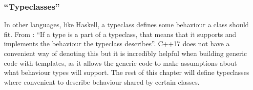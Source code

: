


\subsubsection{``Typeclasses''}
In other languages, like Haskell, a typeclass defines some behaviour a class should fit. From \cite{learnyouahaskell}: ``If a type is a part of a typeclass, that means that it supports and implements the behaviour the typeclass describes''.
C++17 does not have a convenient way of denoting this but it is incredibly helpful when building generic code with templates, as it allows the generic code to make assumptions about what behaviour types will support.
The rest of this chapter will define typeclasses where convenient to describe behaviour shared by certain classes.
\clearpage






